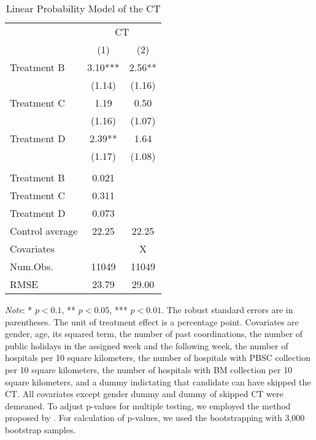 \documentclass[12pt, a4paper]{article}
\begin{document}
\begin{table}

\caption{\label{tab:lm-test}Linear Probability Model of the CT}
\centering
\fontsize{8}{10}\selectfont
\begin{threeparttable}
\begin{tabular}[t]{>{\raggedright\arraybackslash}p{20em}cc}
\toprule
\multicolumn{1}{c}{ } & \multicolumn{2}{c}{CT} \\
\cmidrule(l{3pt}r{3pt}){2-3}
  & (1) & (2)\\
\midrule
Treatment B & \num{3.10}*** & \num{2.56}**\\
 & (\num{1.14}) & (\num{1.16})\\
Treatment C & \num{1.19} & \num{0.50}\\
 & (\num{1.16}) & (\num{1.07})\\
Treatment D & \num{2.39}** & \num{1.64}\\
 & (\num{1.17}) & (\num{1.08})\\
\midrule
\addlinespace[0.3em]
\multicolumn{3}{l}{\textit{Adjustment of p-values for Multiple Testing}}\\
\hspace{1em}Treatment B & 0.021 & \\
\hspace{1em}Treatment C & 0.311 & \\
\hspace{1em}Treatment D & 0.073 & \\
Control average & 22.25 & 22.25\\
Covariates &  & X\\
Num.Obs. & \num{11049} & \num{11049}\\
RMSE & \num{23.79} & \num{29.00}\\
\bottomrule
\end{tabular}
\begin{tablenotes}
\item \emph{Note}: * $p < 0.1$, ** $p < 0.05$, *** $p < 0.01$. The robust standard errors are in parentheses. The unit of treatment effect is a percentage point. Covariates are gender, age, its squared term, the number of past coordinations, the number of public holidays in the assigned week and the following week, the number of hospitals per 10 square kilometers, the number of hospitals with PBSC collection per 10 square kilometers, the number of hospitals with BM collection per 10 square kilometers, and a dummy indictating that candidate can have skipped the CT. All covariates except gender dummy and dummy of skipped CT were demeaned. To adjust p-values for multiple testing, we employed the method proposed by \citet{List2019}. For calculation of p-values, we used the bootstrapping with 3,000 bootstrap samples.
\end{tablenotes}
\end{threeparttable}
\end{table}
\end{document}
